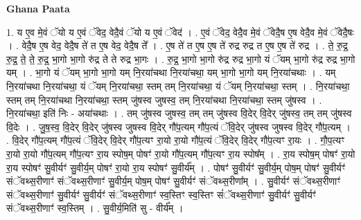 \documentclass[17pt]{extarticle}
\begin{document}
\textbf{Ghana Paata } \newline

1. य ए॒व मे॒वं ॅयो य ए॒वं ॅवेद॒ वेदै॒वं ॅयो य ए॒वं ॅवेद॑ । . ए॒वं ॅवेद॒ वेदै॒व मे॒वं ॅवेदै॒ष ए॒ष वेदै॒व मे॒वं ॅवेदै॒षः । . वेदै॒ष ए॒ष वेद॒ वेदै॒ष ते॑ त ए॒ष वेद॒ वेदै॒ष ते᳚ । . ए॒ष ते॑ त ए॒ष ए॒ष ते॑ रुद्र रुद्र त ए॒ष ए॒ष ते॑ रुद्र । . ते॒ रु॒द्र॒ रु॒द्र॒ ते॒ ते॒ रु॒द्र॒ भा॒गो भा॒गो रु॑द्र ते ते रुद्र भा॒गः । . रु॒द्र॒ भा॒गो भा॒गो रु॑द्र रुद्र भा॒गो यं ॅयम् भा॒गो रु॑द्र रुद्र भा॒गो यम् । . भा॒गो यं ॅयम् भा॒गो भा॒गो यम् नि॒रया॑चथा नि॒रया॑चथा॒ यम् भा॒गो भा॒गो यम् नि॒रया॑चथाः । . यम् नि॒रया॑चथा नि॒रया॑चथा॒ यं ॅयम् नि॒रया॑चथा॒ स्तम् तम् नि॒रया॑चथा॒ यं ॅयम् नि॒रया॑चथा॒ स्तम् । . नि॒रया॑चथा॒ स्तम् तम् नि॒रया॑चथा नि॒रया॑चथा॒ स्तम् जु॑षस्व जुषस्व॒ तम् नि॒रया॑चथा नि॒रया॑चथा॒ स्तम् जु॑षस्व । . नि॒रया॑चथा॒ इति॑ निः - अया॑चथाः । . तम् जु॑षस्व जुषस्व॒ तम् तम् जु॑षस्व वि॒देर् वि॒देर् जु॑षस्व॒ तम् तम् जु॑षस्व वि॒देः । . जु॒ष॒स्व॒ वि॒देर् वि॒देर् जु॑षस्व जुषस्व वि॒देर् गौ॑प॒त्यम् गौ॑प॒त्यं ॅवि॒देर् जु॑षस्व जुषस्व वि॒देर् गौ॑प॒त्यम् । . वि॒देर् गौ॑प॒त्यम् गौ॑प॒त्यं ॅवि॒देर् वि॒देर् गौ॑प॒त्यꣳ रा॒यो रा॒यो गौ॑प॒त्यं ॅवि॒देर् वि॒देर् गौ॑प॒त्यꣳ रा॒यः । . गौ॒प॒त्यꣳ रा॒यो रा॒यो गौ॑प॒त्यम् गौ॑प॒त्यꣳ रा॒य स्पोष॒म् पोषꣳ॑ रा॒यो गौ॑प॒त्यम् गौ॑प॒त्यꣳ रा॒य स्पोष᳚म् । . रा॒य स्पोष॒म् पोषꣳ॑ रा॒यो रा॒य स्पोषꣳ॑ सु॒वीर्यꣳ॑ सु॒वीर्य॒म् पोषꣳ॑ रा॒यो रा॒य स्पोषꣳ॑ सु॒वीर्य᳚म् । . पोषꣳ॑ सु॒वीर्यꣳ॑ सु॒वीर्य॒म् पोष॒म् पोषꣳ॑ सु॒वीर्यꣳ॑ संॅवथ्स॒रीणाꣳ॑ संॅवथ्स॒रीणाꣳ॑ सु॒वीर्य॒म् पोष॒म् पोषꣳ॑ सु॒वीर्यꣳ॑ संॅवथ्स॒रीणा᳚म् । . सु॒वीर्यꣳ॑ संॅवथ्स॒रीणाꣳ॑ संॅवथ्स॒रीणाꣳ॑ सु॒वीर्यꣳ॑ सु॒वीर्यꣳ॑ संॅवथ्स॒रीणाꣳ॑ स्व॒स्तिꣳ स्व॒स्तिꣳ सं॑ॅवथ्स॒रीणाꣳ॑ सु॒वीर्यꣳ॑ सु॒वीर्यꣳ॑ संॅवथ्स॒रीणाꣳ॑ स्व॒स्तिम् । . सु॒वीर्य॒मिति॑ सु - वीर्य᳚म् । \newline
\end{document}
